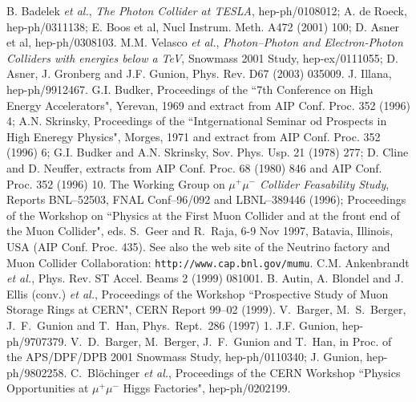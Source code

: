 \begin{thebibliography}{999}
 B. Badelek {\it et al.}, {\it The Photon Collider at 
TESLA}, hep-ph/0108012; A. de Roeck, hep-ph/0311138; 
E. Boos et al, Nucl Instrum. Meth. A472 (2001) 100;
D. Asner et al, hep-ph/0308103. 
%
 M.M. Velasco {\it et al.}, {\it Photon--Photon and 
Electron-Photon Colliders with energies below a TeV}, Snowmass 2001 Study, 
hep-ex/0111055; D. Asner, J. Gronberg and J.F. Gunion, Phys. Rev. D67 (2003) 
035009. 
%
 J. Illana, hep-ph/9912467. 
 G.I. Budker, Proceedings of the ``7th Conference on High
Energy Accelerators", Yerevan, 1969 and extract from AIP Conf. Proc. 352 (1996)
4; A.N. Skrinsky,  Proceedings of the ``Intgernational Seminar od Prospects in 
High Eneregy Physics", Morges, 1971 and extract from AIP Conf. Proc. 352 
(1996) 6; G.I. Budker and A.N. Skrinsky, Sov. Phys. Usp. 21 (1978) 277; 
D. Cline and D. Neuffer, extracts from AIP Conf. Proc. 68 (1980) 846 and 
AIP Conf. Proc. 352 (1996) 10. 
%
 The Working Group on {\it $\mu^+ \mu^-$ Collider 
Feasability Study}, Reports BNL--52503, FNAL Conf--96/092 and LBNL--389446 
(1996); Proceedings of the Workshop on ``Physics at the First Muon Collider 
    and at the front end of the Muon Collider", eds. S.~Geer and R.~Raja, 
    6-9 Nov 1997, Batavia, Illinois, USA (AIP Conf. Proc. 435). 
    See also the web site of the Neutrino factory and Muon Collider 
    Collaboration: {\tt http://www.cap.bnl.gov/mumu}. 
%
  C.M. Ankenbrandt {\it et al.}, Phys. Rev. ST Accel. 
Beams 2 (1999) 081001. 
%
 B. Autin, A. Blondel and J. Ellis (conv.) {\it et al.}, 
Proceedings of the Workshop ``Prospective Study of Muon Storage  Rings at 
CERN", CERN Report 99--02 (1999).
%
 V.~Barger, M.~S.~Berger, J.~F.~Gunion and T.~Han,
Phys.\ Rept.\ 286 (1997) 1. 
%
 J.F. Gunion, hep-ph/9707379.
%
 V.~D.~Barger, M.~Berger, J.~F.~Gunion and T.~Han, in Proc. 
of the APS/DPF/DPB 2001 Snowmass Study, hep-ph/0110340; J. Gunion, 
hep-ph/9802258. 
%
 C.~Bl\"ochinger {\it et al.}, Proceedings of the CERN Workshop
``Physics Opportunities at $\mu^+ \mu^-$ Higgs Factories",  hep-ph/0202199. 


\end{thebibliography}
